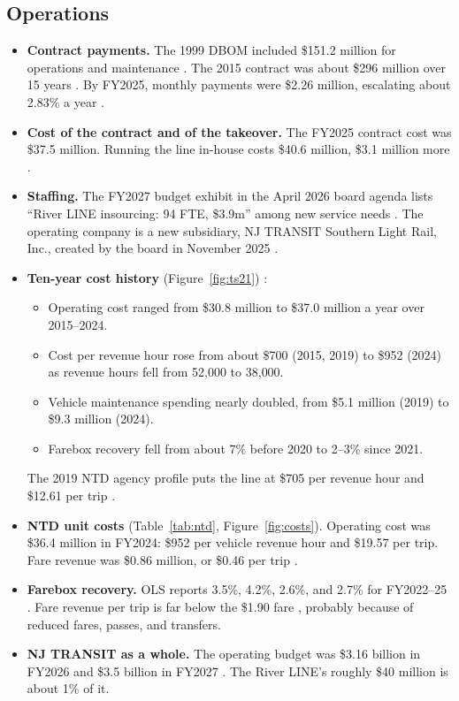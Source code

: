 \documentclass[11pt]{article}
\begin{document}
\subsection{Operations}
\begin{itemize}
\item \textbf{Contract payments.} The 1999 DBOM included \$151.2 million for operations and maintenance \citep{njdot2000groundbreaking}. The 2015 contract was about \$296 million over 15 years \citep{masstransit2014bombardier}. By FY2025, monthly payments were \$2.26 million, escalating about 2.83\% a year \citep{ols2026njt}.
\item \textbf{Cost of the contract and of the takeover.} The FY2025 contract cost was \$37.5 million. Running the line in-house costs \$40.6 million, \$3.1 million more \citep{ols2027njt}.
\item \textbf{Staffing.} The FY2027 budget exhibit in the April 2026 board agenda lists ``River LINE insourcing: 94 FTE, \$3.9m'' among new service needs \citep{njt2026board}. The operating company is a new subsidiary, NJ TRANSIT Southern Light Rail, Inc., created by the board in November 2025 \citep{njt2025board}.
\item \textbf{Ten-year cost history} (Figure~\ref{fig:ts21}) \citep{ntd_ts21}:
  \begin{itemize}
  \item Operating cost ranged from \$30.8 million to \$37.0 million a year over 2015--2024.
  \item Cost per revenue hour rose from about \$700 (2015, 2019) to \$952 (2024) as revenue hours fell from 52{,}000 to 38{,}000.
  \item Vehicle maintenance spending nearly doubled, from \$5.1 million (2019) to \$9.3 million (2024).
  \item Farebox recovery fell from about 7\% before 2020 to 2--3\% since 2021.
  \end{itemize}
  The 2019 NTD agency profile puts the line at \$705 per revenue hour and \$12.61 per trip \citep{ntd_profile2019}.
\item \textbf{NTD unit costs} (Table~\ref{tab:ntd}, Figure~\ref{fig:costs}). Operating cost was \$36.4 million in FY2024: \$952 per vehicle revenue hour and \$19.57 per trip. Fare revenue was \$0.86 million, or \$0.46 per trip \citep{ntd_metrics2224}.
\item \textbf{Farebox recovery.} OLS reports 3.5\%, 4.2\%, 2.6\%, and 2.7\% for FY2022--25 \citep{ols2026njt}. Fare revenue per trip is far below the \$1.90 fare \citep{njt_fares}, probably because of reduced fares, passes, and transfers.
\item \textbf{NJ TRANSIT as a whole.} The operating budget was \$3.16 billion in FY2026 and \$3.5 billion in FY2027 \citep{njt_fy26budget,njt_fy27budget}. The River LINE's roughly \$40 million is about 1\% of it.
\end{itemize}
\end{document}
